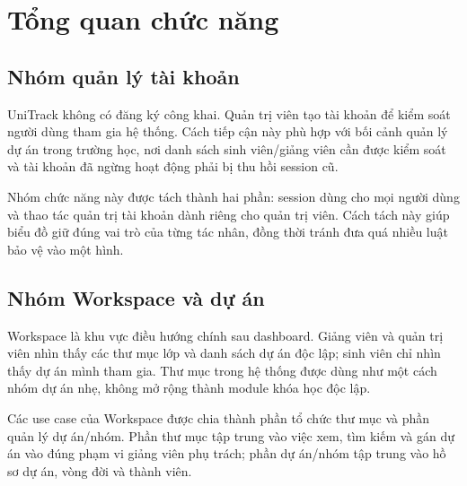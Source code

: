 \section{Tổng quan chức năng}

\figUseCaseOverview

\subsection{Nhóm quản lý tài khoản}

UniTrack không có đăng ký công khai. Quản trị viên tạo tài khoản để kiểm soát người dùng tham gia hệ thống. Cách tiếp cận này phù hợp với bối cảnh quản lý dự án trong trường học, nơi danh sách sinh viên/giảng viên cần được kiểm soát và tài khoản đã ngừng hoạt động phải bị thu hồi session cũ.

Nhóm chức năng này được tách thành hai phần: session dùng cho mọi người dùng và thao tác quản trị tài khoản dành riêng cho quản trị viên. Cách tách này giúp biểu đồ giữ đúng vai trò của từng tác nhân, đồng thời tránh đưa quá nhiều luật bảo vệ vào một hình.

\figAccountSessionUseCases

\figAdminAccountUseCases

\subsection{Nhóm Workspace và dự án}

Workspace là khu vực điều hướng chính sau dashboard. Giảng viên và quản trị viên nhìn thấy các thư mục lớp và danh sách dự án độc lập; sinh viên chỉ nhìn thấy dự án mình tham gia. Thư mục trong hệ thống được dùng như một cách nhóm dự án nhẹ, không mở rộng thành module khóa học độc lập.

Các use case của Workspace được chia thành phần tổ chức thư mục và phần quản lý dự án/nhóm. Phần thư mục tập trung vào việc xem, tìm kiếm và gán dự án vào đúng phạm vi giảng viên phụ trách; phần dự án/nhóm tập trung vào hồ sơ dự án, vòng đời và thành viên.

\figWorkspaceFolderUseCases

